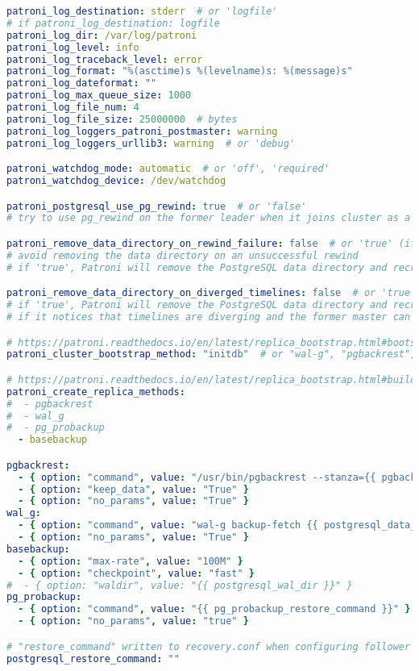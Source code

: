 \begin{flushleft}
\begin{lstlisting}[language=yaml, caption=Testsystem - Anhang - Maintenance - main.yml,captionpos=b,label={lst:testsystem-maintenance-main.yml},breaklines=true]
patroni_log_destination: stderr  # or 'logfile'
# if patroni_log_destination: logfile
patroni_log_dir: /var/log/patroni
patroni_log_level: info
patroni_log_traceback_level: error
patroni_log_format: "%(asctime)s %(levelname)s: %(message)s"
patroni_log_dateformat: ""
patroni_log_max_queue_size: 1000
patroni_log_file_num: 4
patroni_log_file_size: 25000000  # bytes
patroni_log_loggers_patroni_postmaster: warning
patroni_log_loggers_urllib3: warning  # or 'debug'

patroni_watchdog_mode: automatic  # or 'off', 'required'
patroni_watchdog_device: /dev/watchdog

patroni_postgresql_use_pg_rewind: true  # or 'false'
# try to use pg_rewind on the former leader when it joins cluster as a replica.

patroni_remove_data_directory_on_rewind_failure: false  # or 'true' (if use_pg_rewind: 'true')
# avoid removing the data directory on an unsuccessful rewind
# if 'true', Patroni will remove the PostgreSQL data directory and recreate the replica.

patroni_remove_data_directory_on_diverged_timelines: false  # or 'true'
# if 'true', Patroni will remove the PostgreSQL data directory and recreate the replica
# if it notices that timelines are diverging and the former master can not start streaming from the new master.

# https://patroni.readthedocs.io/en/latest/replica_bootstrap.html#bootstrap
patroni_cluster_bootstrap_method: "initdb"  # or "wal-g", "pgbackrest", "pg_probackup"

# https://patroni.readthedocs.io/en/latest/replica_bootstrap.html#building-replicas
patroni_create_replica_methods:
#  - pgbackrest
#  - wal_g
#  - pg_probackup
  - basebackup

pgbackrest:
  - { option: "command", value: "/usr/bin/pgbackrest --stanza={{ pgbackrest_stanza }} --delta restore" }
  - { option: "keep_data", value: "True" }
  - { option: "no_params", value: "True" }
wal_g:
  - { option: "command", value: "wal-g backup-fetch {{ postgresql_data_dir }} LATEST" }
  - { option: "no_params", value: "True" }
basebackup:
  - { option: "max-rate", value: "100M" }
  - { option: "checkpoint", value: "fast" }
#  - { option: "waldir", value: "{{ postgresql_wal_dir }}" }
pg_probackup:
  - { option: "command", value: "{{ pg_probackup_restore_command }}" }
  - { option: "no_params", value: "true" }

# "restore_command" written to recovery.conf when configuring follower (create replica)
postgresql_restore_command: ""


\end{lstlisting}
\end{flushleft}
